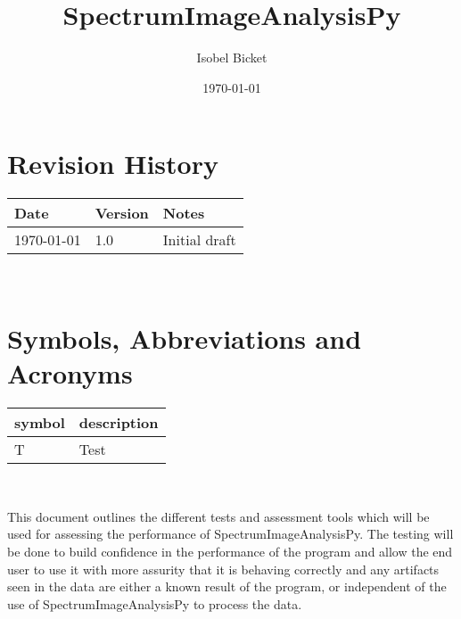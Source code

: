 \documentclass[12pt, titlepage]{article}
\newcommand{\progname}{SpectrumImageAnalysisPy}
\begin{document}

\title{SpectrumImageAnalysisPy} 
\author{Isobel Bicket}
\date{\today}
	
\maketitle


\section{Revision History}

\begin{tabularx}{\textwidth}{p{4cm}p{2cm}X}
\toprule {\bf Date} & {\bf Version} & {\bf Notes}\\
\midrule
\today & 1.0 & Initial draft\\
\bottomrule
\end{tabularx}

~\newpage

\section{Symbols, Abbreviations and Acronyms}

\renewcommand{\arraystretch}{1.2}
\begin{tabular}{l l} 
  \toprule		
  \textbf{symbol} & \textbf{description}\\
  \midrule 
  T & Test\\
  \bottomrule
\end{tabular}\\


\newpage

\tableofcontents

\listoftables

\listoffigures

\newpage


This document outlines the different tests and assessment tools which will be used for assessing the performance of \progname{}. The testing will be done to build confidence in the performance of the program and allow the end user to use it with more assurity that it is behaving correctly and any artifacts seen in the data are either a known result of the program, or independent of the use of \progname{} to process the data.
\end{document}
